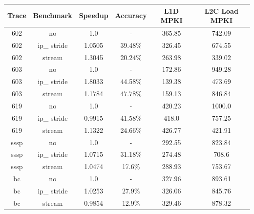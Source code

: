 \documentclass{article}
\begin{document}
  \begin{table}[H]
  \centering
  \begin{tabular}{|c|c|c|c|c|c|}
  \hline
  \textbf{Trace} & \textbf{Benchmark} & \textbf{Speedup} & \textbf{Accuracy} & \textbf{L1D MPKI} & \textbf{L2C Load MPKI}\\ \hline
  
  602 & no & 1.0 & - & 365.85 & 742.09 \\ \hline
  602 & ip\_ stride & 1.0505 & 39.48\% & 326.45 & 674.55 \\ \hline
  602 & stream & 1.3045 & 20.24\% & 263.98 & 339.02 \\ \hline  
  603 & no & 1.0 & - & 172.86 & 949.28 \\ \hline
  603 & ip\_ stride & 1.8033 & 44.58\% & 139.38 & 473.69 \\ \hline
  603 & stream & 1.1784 & 47.78\% & 159.13 & 846.84 \\ \hline  
  619 & no & 1.0 & - & 420.23 & 1000.0 \\ \hline
  619 & ip\_ stride & 0.9915 & 41.58\% & 418.0 & 757.25 \\ \hline
  619 & stream & 1.1322 & 24.66\% & 426.77 & 421.91 \\ \hline  
  sssp & no & 1.0 & - & 292.55 & 823.84 \\ \hline
  sssp & ip\_ stride & 1.0715 & 31.18\% & 274.48 & 708.6 \\ \hline
  sssp & stream & 1.0474 & 17.6\% & 288.93 & 753.67 \\ \hline  
  bc & no & 1.0 & - & 327.96 & 893.61 \\ \hline
  bc & ip\_ stride & 1.0253 & 27.9\% & 326.06 & 845.76 \\ \hline
  bc & stream & 0.9854 & 12.9\% & 329.46 & 878.32 \\ \hline
  
\end{tabular}
\end{table}
\end{document}
